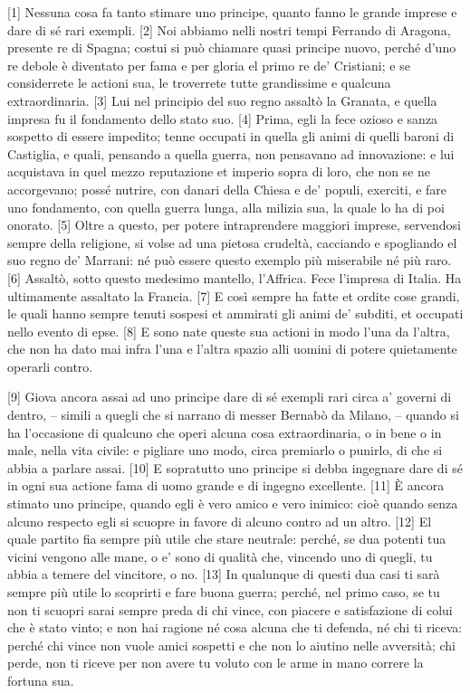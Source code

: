 
{[}1{]} Nessuna cosa fa tanto stimare uno principe, quanto fanno le
grande imprese e dare di sé rari exempli. {[}2{]} Noi abbiamo nelli
nostri tempi Ferrando di Aragona, presente re di Spagna; costui si può
chiamare quasi principe nuovo, perché d'uno re debole è diventato per
fama e per gloria el primo re de' Cristiani; e se considerrete le
actioni sua, le troverrete tutte grandissime e qualcuna extraordinaria.
{[}3{]} Lui nel principio del suo regno assaltò la Granata, e quella
impresa fu il fondamento dello stato suo. {[}4{]} Prima, egli la fece
ozioso e sanza sospetto di essere impedito; tenne occupati in quella gli
animi di quelli baroni di Castiglia, e quali, pensando a quella guerra,
non pensavano ad innovazione: e lui acquistava in quel mezzo reputazione
et imperio sopra di loro, che non se ne accorgevano; possé nutrire, con
danari della Chiesa e de' populi, exerciti, e fare uno fondamento, con
quella guerra lunga, alla milizia sua, la quale lo ha di poi onorato.
{[}5{]} Oltre a questo, per potere intraprendere maggiori imprese,
servendosi sempre della religione, si volse ad una pietosa crudeltà,
cacciando e spogliando el suo regno de' Marrani: né può essere questo
exemplo più miserabile né più raro. {[}6{]} Assaltò, sotto questo
medesimo mantello, l'Affrica. Fece l'impresa di Italia. Ha ultimamente
assaltato la Francia. {[}7{]} E così sempre ha fatte et ordite cose
grandi, le quali hanno sempre tenuti sospesi et ammirati gli animi de'
subditi, et occupati nello evento di epse. {[}8{]} E sono nate queste
sua actioni in modo l'una da l'altra, che non ha dato mai infra l'una e
l'altra spazio alli uomini di potere quietamente operarli contro.

{[}9{]} Giova ancora assai ad uno principe dare di sé exempli rari circa
a' governi di dentro, -- simili a quegli che si narrano di messer
Bernabò da Milano, -- quando si ha l'occasione di qualcuno che operi
alcuna cosa extraordinaria, o in bene o in male, nella vita civile: e
pigliare uno modo, circa premiarlo o punirlo, di che si abbia a parlare
assai. {[}10{]} E sopratutto uno principe si debba ingegnare dare di sé
in ogni sua actione fama di uomo grande e di ingegno excellente.
{[}11{]} È ancora stimato uno principe, quando egli è vero amico e vero
inimico: cioè quando senza alcuno respecto egli si scuopre in favore di
alcuno contro ad un altro. {[}12{]} El quale partito fia sempre più
utile che stare neutrale: perché, se dua potenti tua vicini vengono alle
mane, o e' sono di qualità che, vincendo uno di quegli, tu abbia a
temere del vincitore, o no. {[}13{]} In qualunque di questi dua casi ti
sarà sempre più utile lo scoprirti e fare buona guerra; perché, nel
primo caso, se tu non ti scuopri sarai sempre preda di chi vince, con
piacere e satisfazione di colui che è stato vinto; e non hai ragione né
cosa alcuna che ti defenda, né chi ti riceva: perché chi vince non vuole
amici sospetti e che non lo aiutino nelle avversità; chi perde, non ti
riceve per non avere tu voluto con le arme in mano correre la fortuna
sua.

